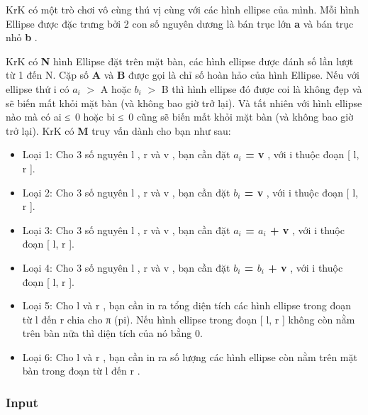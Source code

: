 





   KrK có một trò chơi vô cùng thú vị cùng với các hình ellipse của mình. Mỗi hình Ellipse được đặc trưng bởi 2 con số nguyên dương là bán trục lớn   \textbf{    a   }   và bán trục nhỏ   \textbf{    b   }   .  

   KrK có   \textbf{    N   }   hình Ellipse đặt trên mặt bàn, các hình ellipse được đánh số lần lượt từ 1 đến N. Cặp số   \textbf{    A   }   và   \textbf{    B   }   được gọi là chỉ số hoàn hảo của hình Ellipse. Nếu với ellipse thứ i có $a_{i}$   $>$ A hoặc $b_{i}$   $>$ B thì hình ellipse đó được coi là không đẹp và sẽ biến mất khỏi mặt bàn (và không bao giờ trở lại). Và tất nhiên với hình ellipse nào mà có ai ≤ 0 hoặc bi ≤ 0 cũng sẽ biến mất khỏi mặt bàn (và không bao giờ trở lại). KrK có   \textbf{    M   }   truy vấn dành cho bạn như sau:  


\begin{itemize}
	\item     Loại 1: Cho 3 số nguyên    l    ,    r    và    v    , bạn cần đặt    \textbf{     $a_{i}$     = v    }    , với i thuộc đoạn [    l, r    ].   
	\item     Loại 2: Cho 3 số nguyên    l    ,    r    và    v    , bạn cần đặt    \textbf{     $b_{i}$     = v    }    , với i thuộc đoạn [    l, r    ].   
	\item     Loại 3: Cho 3 số nguyên    l    ,    r    và    v    , bạn cần đặt    \textbf{     $a_{i}$     = $a_{i}$     + v    }    , với i thuộc đoạn [    l, r    ].   
	\item     Loại 4: Cho 3 số nguyên    l    ,    r    và    v    , bạn cần đặt    \textbf{     $b_{i}$     = $b_{i}$     + v    }    , với i thuộc đoạn [    l, r    ].   
	\item     Loại 5: Cho    l    và    r    , bạn cần in ra tổng diện tích các hình ellipse trong đoạn từ    l    đến    r    chia cho π (pi). Nếu hình ellipse trong đoạn [    l, r    ] không còn nằm trên bàn nữa thì diện tích của nó bằng 0.   
	\item     Loại 6: Cho    l    và    r    , bạn cần in ra số lượng các hình ellipse còn nằm trên mặt bàn trong đoạn từ    l    đến    r    .   
\end{itemize}



\subsubsection{   Input  }

